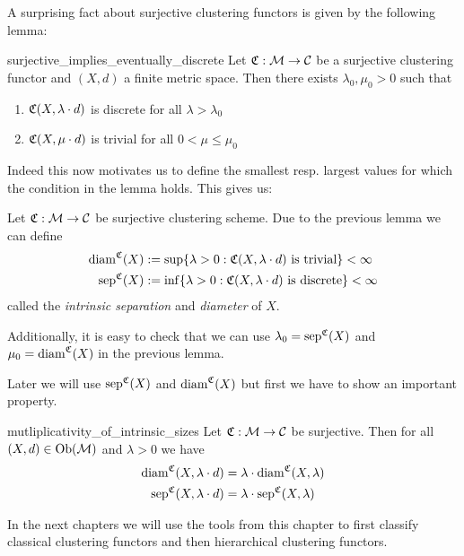 A surprising fact about surjective clustering functors is given by the following lemma:

\begin{lemma}{}{surjective_implies_eventually_discrete}
Let $\mathfrak{C}: \mathcal{M} \to \mathcal{C}$ be a surjective clustering functor and $(X,d)$ a finite metric space. Then there exists $\lambda_0, \mu_0 > 0$ such that
\begin{enumerate}
    \item $\mathfrak{C}(X,\lambda \cdot d)$ is discrete for all $\lambda > \lambda_0$
    \item $\mathfrak{C}(X,\mu \cdot d)$ is trivial for all $0 < \mu \le \mu_0$
\end{enumerate}
\end{lemma}

Indeed this now motivates us to define the smallest resp. largest values for which the condition in the lemma holds. This gives us:

\begin{definition}{}{}
Let $\mathfrak{C}: \mathcal{M} \to \mathcal{C}$ be surjective clustering scheme. Due to the previous lemma we can define
\begin{align*}
\mathrm{diam}^{\mathfrak{C}}(X) &:= \sup\{ \lambda > 0: \mathfrak{C}(X,\lambda \cdot d) \text{ is trivial}\} < \infty\\
\mathrm{sep}^{\mathfrak{C}}(X) &:= \inf\{ \lambda > 0: \mathfrak{C}(X,\lambda \cdot d) \text{ is discrete}\} < \infty
\end{align*}
called the \emph{intrinsic separation} and \emph{diameter} of $X$. 
\end{definition}
Additionally, it is easy to check that we can use $\lambda_0 = \mathrm{sep}^{\mathfrak{C}}(X)$ and $\mu_0 = \mathrm{diam}^{\mathfrak{C}}(X)$ in the previous lemma.

Later we will use $\mathrm{sep}^{\mathfrak{C}}(X)$ and $\mathrm{diam}^{\mathfrak{C}}(X)$ but first we have to show an important property.

\begin{lemma}{}{mutliplicativity_of_intrinsic_sizes}
Let $\mathfrak{C}: \mathcal{M} \to \mathcal{C}$ be surjective. Then for all $(X,d) \in \mathrm {Ob}(\mathcal{M})$ and $\lambda > 0$ we have
\begin{align*}{}{}
    \mathrm{diam}^{\mathfrak{C}}(X,\lambda \cdot d) &= \lambda \cdot \mathrm{diam}^{\mathfrak{C}}(X,\lambda) \\
    \mathrm{sep}^{\mathfrak{C}}(X,\lambda \cdot d) &= \lambda \cdot \mathrm{sep}^{\mathfrak{C}}(X,\lambda)
\end{align*}
 \end{lemma}

In the next chapters we will use the tools from this chapter to first classify classical clustering functors and then hierarchical clustering functors.